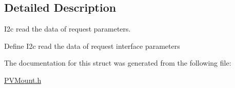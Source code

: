 \subsection{Detailed Description}
I2c read the data of request parameters. 

Define I2c read the data of request interface parameters 

The documentation for this struct was generated from the following file\+:\begin{DoxyCompactItemize}
\item 
\hyperlink{_p_v_mount_8h}{P\+V\+Mount.\+h}\end{DoxyCompactItemize}
